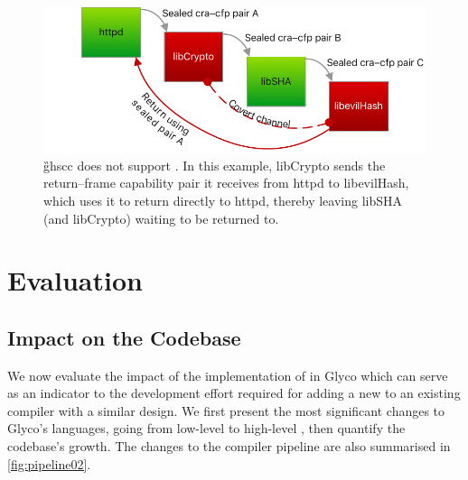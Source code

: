\documentclass[main.tex]{subfiles}
\begin{document}
\begin{figure}
	\centering
	\includegraphics{Images/Semi-WBCF.pdf}
	\caption{\G{ghscc} does not support . In this example, libCrypto sends the return–frame capability pair it receives from httpd to libevilHash, which uses it to return directly to httpd, thereby leaving libSHA (and libCrypto) waiting to be returned to.}
	\label{fig:semi-wbcf}
\end{figure}

\section{Evaluation} \label{sct:ghscc-eval}
\subsection{Impact on the Codebase}
We now evaluate the impact of the implementation of  in Glyco which can serve as an indicator to the development effort required for adding a new  to an existing  compiler with a similar design. We first present the most significant changes to Glyco's languages, going from low-level to high-level , then quantify the codebase's growth. The changes to the compiler pipeline are also summarised in \cref{fig:pipeline02}.
\end{document}
